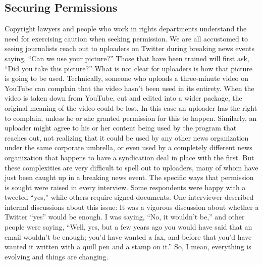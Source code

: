 \begin{enumerate}
\section{Securing Permissions}
Copyright lawyers and people who work in rights departments understand
the need for exercising caution when seeking permission. We are all accustomed
to seeing journalists reach out to uploaders on Twitter during breaking
news events saying, ``Can we use your picture?'' Those that have been
trained will first ask, ``Did you take this picture?''
What is not clear for uploaders is how that picture is going to be used.
Technically, someone who uploads a three-minute video on YouTube can
complain that the video hasn't been used in its entirety. When the video is
taken down from YouTube, cut and edited into a wider package, the original
meaning of the video could be lost. In this case an uploader has the right to
complain, unless he or she granted permission for this to happen. Similarly,
an uploader might agree to his or her content being used by the program
that reaches out, not realizing that it could be used by any other news organization
under the same corporate umbrella, or even used by a completely
different news organization that happens to have a syndication deal in place
with the first. But these complexities are very difficult to spell out to uploaders,
many of whom have just been caught up in a breaking news event.
The specific ways that permission is sought were raised in every interview.
Some respondents were happy with a tweeted ``yes,'' while others require
signed documents. One interviewer described internal discussions about
this issue:
It was a vigorous discussion about whether a Twitter ``yes'' would be
enough. I was saying, ``No, it wouldn't be,'' and other people were saying,
``Well, yes, but a few years ago you would have said that an email
wouldn't be enough; you'd have wanted a fax, and before that you'd
have wanted it written with a quill pen and a stamp on it.'' So, I mean,
everything is evolving and things are changing.


\end{enumerate}
